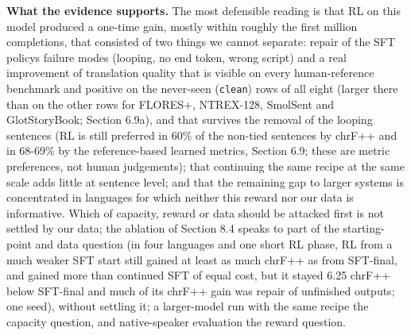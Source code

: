 \textbf{What the evidence supports.} The most defensible reading is that RL on this model produced a one-time gain, mostly within roughly the first million completions, that consisted of two things we cannot separate: repair of the SFT policy\textquotesingle s failure modes (looping, no end token, wrong script) and a real improvement of translation quality that is visible on every human-reference benchmark and positive on the never-seen (\texttt{clean}) rows of all eight (larger there than on the other rows for FLORES+, NTREX-128, SmolSent and GlotStoryBook; Section 6.9a), and that survives the removal of the looping sentences (RL is still preferred in 60\% of the non-tied sentences by chrF++ and in 68-69\% by the reference-based learned metrics, Section 6.9; these are metric preferences, not human judgements); that continuing the same recipe at the same scale adds little at sentence level; and that the remaining gap to larger systems is concentrated in languages for which neither this reward nor our data is informative. Which of capacity, reward or data should be attacked first is not settled by our data; the ablation of Section 8.4 speaks to part of the starting-point and data question (in four languages and one short RL phase, RL from a much weaker SFT start still gained at least as much chrF++ as from SFT-final, and gained more than continued SFT of equal cost, but it stayed 6.25 chrF++ below SFT-final and much of its chrF++ gain was repair of unfinished outputs; one seed), without settling it; a larger-model run with the same recipe the capacity question, and native-speaker evaluation the reward question.

